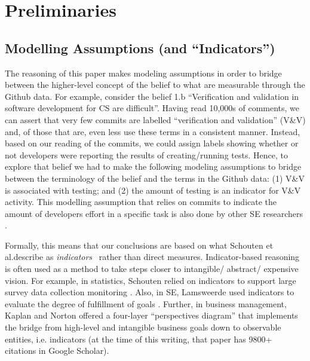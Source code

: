 \documentclass[sigconf]{acmart}
\begin{document}
 
 

\section{Preliminaries} 


\subsection{Modelling Assumptions (and ``Indicators'')}\label{model}

The reasoning of this 
paper makes
modeling assumptions in order to bridge between the higher-level concept of the belief to what are measurable through the Github data. For example, consider the belief 1.b ``Verification and validation in software development for CS are difficult''.  
Having read 10,000s of comments, we can assert that 
very few commits are labelled  ``verification and validation'' (V\&V) and, of those that are,
even less use these terms in a consistent manner. Instead, based on our reading of the commits, we could assign labels showing whether or not developers were reporting the results of creating/running tests. Hence, to explore that belief we had to make the following modeling assumptions to bridge between the terminology of the belief and the terms in the Github data: (1) V\&V is associated with testing; and (2) the amount of testing is an indicator for V\&V activity. This modelling assumption that relies on commits to indicate the amount of developers effort in a specific  task is also done by other SE researchers \cite{vasilescu16_limit, xia2019sequential}.


Formally, this means that our conclusions are based on what
Schouten et al.describe as
 {\em indicators}~\cite{schouten2010indicators} rather than direct measures. Indicator-based reasoning is often used as a method to take steps closer to intangible/ abstract/ expensive vision. For example,
 in statistics, Schouten relied on indicators to support large survey data collection monitoring \cite{schouten2010indicators}. Also, in SE, Lamsweerde used indicators to evaluate the degree of fulfillment of goals \cite{vanLamsweerde2009_requirement}.
 Further, in business 
 management, Kaplan and Norton \cite{kaplan1996using} offered a four-layer ``perspectives diagram'' that implements the bridge from high-level and intangible business goals down
 to observable entities, i.e. indicators (at the time of this
 writing, that paper has  9800+ citations in Google Scholar).
   
\end{document}
